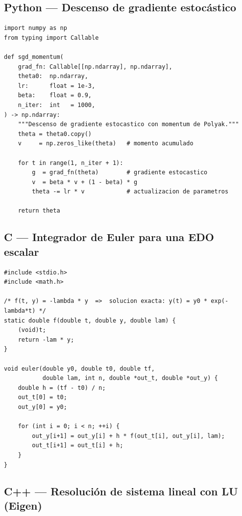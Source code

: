 \subsection{Python — Descenso de gradiente estocástico}
\label{subsec:python}

\begin{lstlisting}[style=python,
  caption={SGD con momentum para un modelo de regresión logística},
  label={lst:sgd}]
import numpy as np
from typing import Callable

def sgd_momentum(
    grad_fn: Callable[[np.ndarray], np.ndarray],
    theta0:  np.ndarray,
    lr:      float = 1e-3,
    beta:    float = 0.9,
    n_iter:  int   = 1000,
) -> np.ndarray:
    """Descenso de gradiente estocastico con momentum de Polyak."""
    theta = theta0.copy()
    v     = np.zeros_like(theta)   # momento acumulado

    for t in range(1, n_iter + 1):
        g  = grad_fn(theta)        # gradiente estocastico
        v  = beta * v + (1 - beta) * g
        theta -= lr * v            # actualizacion de parametros

    return theta
\end{lstlisting}

\subsection{C — Integrador de Euler para una EDO escalar}
\label{subsec:c}

\begin{lstlisting}[style=c,
  caption={Método de Euler explícito: $\equ{y}' = \eqfn{f}(\eqk{t}, \equ{y})$},
  label={lst:euler-c}]
#include <stdio.h>
#include <math.h>

/* f(t, y) = -lambda * y  =>  solucion exacta: y(t) = y0 * exp(-lambda*t) */
static double f(double t, double y, double lam) {
    (void)t;
    return -lam * y;
}

void euler(double y0, double t0, double tf,
           double lam, int n, double *out_t, double *out_y) {
    double h = (tf - t0) / n;
    out_t[0] = t0;
    out_y[0] = y0;

    for (int i = 0; i < n; ++i) {
        out_y[i+1] = out_y[i] + h * f(out_t[i], out_y[i], lam);
        out_t[i+1] = out_t[i] + h;
    }
}
\end{lstlisting}

\subsection{C++ — Resolución de sistema lineal con LU (Eigen)}
\label{subsec:cpp}

